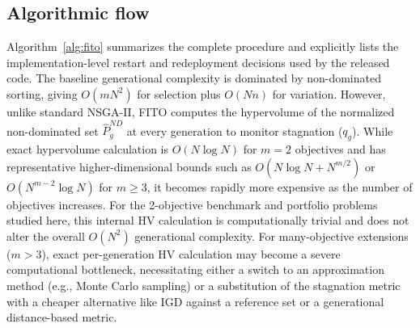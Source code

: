 \documentclass[preprint,12pt]{elsarticle}
\begin{document}
\subsection{Algorithmic flow}

Algorithm~\ref{alg:fito} summarizes the complete procedure and explicitly lists the implementation-level restart and redeployment decisions used by the released code. The baseline generational complexity is dominated by non-dominated sorting, giving $O(mN^2)$ for selection plus $O(Nn)$ for variation. However, unlike standard NSGA-II, FITO computes the hypervolume of the normalized non-dominated set $\hat{P}^{ND}_g$ at every generation to monitor stagnation ($q_g$). While exact hypervolume calculation is $O(N \log N)$ for $m=2$ objectives and has representative higher-dimensional bounds such as $O(N \log N + N^{m/2})$ or $O(N^{m-2} \log N)$ for $m \ge 3$, it becomes rapidly more expensive as the number of objectives increases. For the 2-objective benchmark and portfolio problems studied here, this internal HV calculation is computationally trivial and does not alter the overall $O(N^2)$ generational complexity. For many-objective extensions ($m > 3$), exact per-generation HV calculation may become a severe computational bottleneck, necessitating either a switch to an approximation method (e.g., Monte Carlo sampling) or a substitution of the stagnation metric with a cheaper alternative like IGD against a reference set or a generational distance-based metric.
\end{document}

